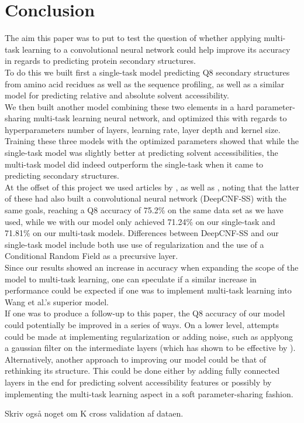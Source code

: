 \section{Conclusion}
The aim this paper was to put to test the question of whether applying multi-task learning to a convolutional neural network could help improve its accuracy in regards to predicting protein secondary structures.\\
To do this we built first a single-task model predicting Q8 secondary structures from amino acid recidues as well as the sequence profiling, as well as a similar model for predicting relative and absolute solvent accessibility.\\
We then built another model combining these two elements in a hard parameter-sharing multi-task learning neural network, and optimized this with regards to hyperparameters number of layers, learning rate, layer depth and kernel size.\\
Training these three models with the optimized parameters showed that while the single-task model was slightly better at predicting solvent accessibilities, the multi-task model did indeed outperform the single-task when it came to predicting secondary structures.\\
At the offset of this project we used articles by \citeauthor{qi-et-al-2012}, \citeauthor{zhou-and-troyanskaya-2014} as well as \citeauthor{wang-et-al-2016}, noting that the latter of these had also built a convolutional neural network (DeepCNF-SS) with the same goals, reaching a Q8 accuracy of 75.2\% on the same data set as we have used, while we with our model only achieved 71.24\% on our single-task and 71.81\% on our multi-task models. Differences between DeepCNF-SS and our single-task model include both use use of regularization and the use of a Conditional Random Field as a precursive layer. \\
Since our results showed an increase in accuracy when expanding the scope of the model to multi-task learning, one can speculate if a similar increase in performance could be expected if one was to implement multi-task learning into Wang et al.'s superior model.\\
If one was to produce a follow-up to this paper, the Q8 accuracy of our model could potentially be improved in a series of ways. On a lower level, attempts could be made at implementing regularization or adding noise, such as applyong a gaussian filter on the intermediate layers (which has shown to be effective by \citeauthor{zhou-and-troyanskaya-2014}).\\
Alternatively, another approach to improving our model could be that of rethinking its structure. This could be done either by adding fully connected layers in the end for predicting solvent accessibility features or possibly by implementing the multi-task learning aspect in a soft parameter-sharing fashion.


Skriv også noget om K cross validation af dataen.